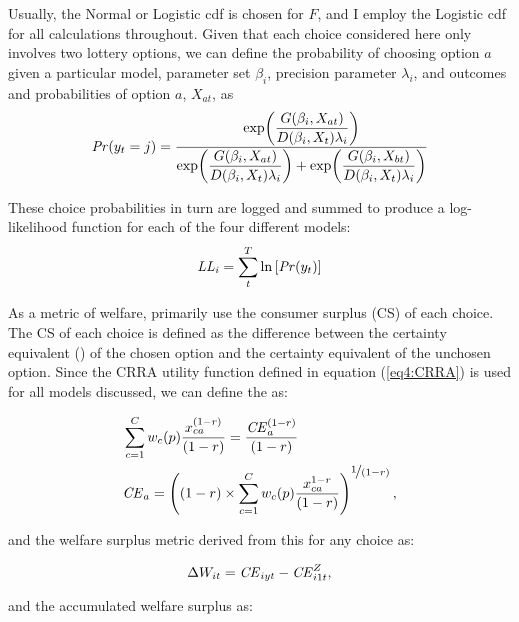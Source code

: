 \documentclass[../main.tex]{subfiles}
\begin{document}
Usually, the Normal or Logistic cdf is chosen for $F$, and I employ the Logistic cdf for all calculations throughout.
Given that each choice considered here only involves two lottery options, we can define the probability of choosing option $a$ given a particular model, parameter set $\beta_i$, precision parameter $\lambda_i$, and outcomes and probabilities of option $a$, $X_{at}$, as
\begin{equation}
	\label{eq4:RE.f}
	{\ensuremath{\mathit{Pr}}}(y_t=j) =\dfrac{\exp\!\left( \dfrac{ G(\beta_i,X_{at}) }{ D(\beta_i,X_{t})\lambda_i }  \right)}{  \exp\!\left( \dfrac{ G(\beta_i,X_{at}) }{ D(\beta_i,X_{t})\lambda_i }  \right) + \exp\!\left( \dfrac{ G(\beta_i,X_{bt}) }{ D(\beta_i,X_{t})\lambda_i }  \right)    }
\end{equation}

\noindent These choice probabilities in turn are logged and summed to produce a log-likelihood function for each of the four different models:
\begin{equation}
	\label{eq4:ll}
	\mathit{LL_i} = \sum_{t}^T \ln \left[ {\mathit{Pr}}(y_t) \right]
\end{equation}

As a metric of welfare, \textcite{Harrison2016} primarily use the consumer surplus (CS) of each choice.
The CS of each choice is defined as the difference between the certainty equivalent ({\CE}) of the chosen option and the certainty equivalent of the unchosen option.
Since the CRRA utility function defined in equation (\ref{eq4:CRRA}) is used for all models discussed, we can define the {\CE} as:

\begin{align}
	\label{eq4:CEcalc}
	\begin{split}
		&\sum_{c=1}^{C} w_c(p) \frac{x_{ca}^{(1-r)}}{(1-r)} = \frac{ {\mathit{CE}}_a^{(1-r)}}{(1-r)}\\
		&{\mathit{CE}}_a =  \left( (1-r) \times \sum_{c=1}^{C} w_c(p) \frac{x_{ca}^{1-r}}{(1-r)} \right)^{ \displaystyle\nicefrac{1}{(1-r)} } ,
	\end{split}
\end{align}

\noindent and the welfare surplus metric derived from this {\CE} for any choice as:

\begin{equation}
	\label{eq4:wsurplus}
	\Delta W_{it} =  {\mathit{CE}}_{iyt} - {\mathit{CE}}_{i1t}^Z ,
\end{equation}

\noindent and the accumulated welfare surplus as:
\end{document}
